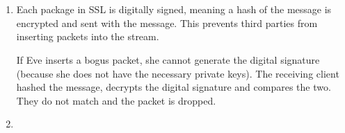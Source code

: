 \documentclass[12pt, a4paper]{article}
\begin{document}
\section{} %
\begin{enumerate}[a]
	\item %
	Each package in SSL is digitally signed, meaning a hash of the message is encrypted and sent with the message. This prevents third parties from inserting packets into the stream.

	If Eve inserts a bogus packet, she cannot generate the digital signature (because she does not have the necessary private keys). The receiving client hashed the message, decrypts the digital signature and compares the two. They do not match and the packet is dropped.
	\item %
\end{enumerate}
\end{document}
